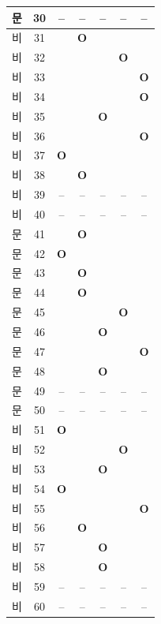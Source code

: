 \documentclass[10pt, a4paper]{article}
\begin{document}
\begin{tabularx}{\textwidth}{|c|c|c|c|c|c|c|}
\hline
[3]문 & 30 & -- & -- & -- & -- & -- \\
\hline
[4]비 & 31 &  & \textbf{O} &  &  &  \\
\hline
[4]비 & 32 &  &  &  & \textbf{O} &  \\
\hline
[4]비 & 33 &  &  &  &  & \textbf{O} \\
\hline
[4]비 & 34 &  &  &  &  & \textbf{O} \\
\hline
[4]비 & 35 &  &  & \textbf{O} &  &  \\
\hline
[4]비 & 36 &  &  &  &  & \textbf{O} \\
\hline
[4]비 & 37 & \textbf{O} &  &  &  &  \\
\hline
[4]비 & 38 &  & \textbf{O} &  &  &  \\
\hline
[4]비 & 39 & -- & -- & -- & -- & -- \\
\hline
[4]비 & 40 & -- & -- & -- & -- & -- \\
\hline
[5]문 & 41 &  & \textbf{O} &  &  &  \\
\hline
[5]문 & 42 & \textbf{O} &  &  &  &  \\
\hline
[5]문 & 43 &  & \textbf{O} &  &  &  \\
\hline
[5]문 & 44 &  & \textbf{O} &  &  &  \\
\hline
[5]문 & 45 &  &  &  & \textbf{O} &  \\
\hline
[5]문 & 46 &  &  & \textbf{O} &  &  \\
\hline
[5]문 & 47 &  &  &  &  & \textbf{O} \\
\hline
[5]문 & 48 &  &  & \textbf{O} &  &  \\
\hline
[5]문 & 49 & -- & -- & -- & -- & -- \\
\hline
[5]문 & 50 & -- & -- & -- & -- & -- \\
\hline
[6]비 & 51 & \textbf{O} &  &  &  &  \\
\hline
[6]비 & 52 &  &  &  & \textbf{O} &  \\
\hline
[6]비 & 53 &  &  & \textbf{O} &  &  \\
\hline
[6]비 & 54 & \textbf{O} &  &  &  &  \\
\hline
[6]비 & 55 &  &  &  &  & \textbf{O} \\
\hline
[6]비 & 56 &  & \textbf{O} &  &  &  \\
\hline
[6]비 & 57 &  &  & \textbf{O} &  &  \\
\hline
[6]비 & 58 &  &  & \textbf{O} &  &  \\
\hline
[6]비 & 59 & -- & -- & -- & -- & -- \\
\hline
[6]비 & 60 & -- & -- & -- & -- & -- \\
\hline
\end{tabularx}
\vspace{5mm}
\end{document}
